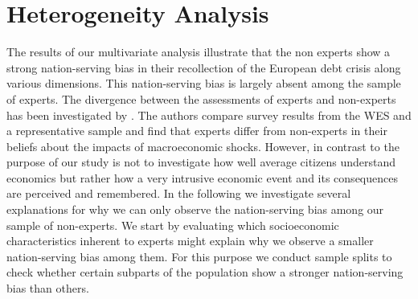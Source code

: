 \section{Heterogeneity Analysis}
 
The results of our multivariate analysis illustrate that the non experts show a strong nation-serving bias in their recollection of the European debt crisis along various dimensions. This nation-serving bias is largely absent among the sample of experts. The divergence between  the assessments of experts and non-experts has been investigated by \cite{roth}. The authors compare survey results from the WES and a representative sample and find that experts differ from non-experts in their beliefs about the impacts of macroeconomic shocks. However, in contrast to \cite{roth} the purpose of our study is not to investigate how well average citizens understand economics but rather how a very intrusive economic event and its consequences are perceived and remembered.
In the following we investigate several explanations for why we can only observe the nation-serving bias among our sample of non-experts. 
We start by evaluating which socioeconomic characteristics inherent to experts might explain why we observe a smaller nation-serving bias among them. For this purpose we conduct sample splits to check whether certain subparts of the population show a stronger nation-serving bias than others.
\\

